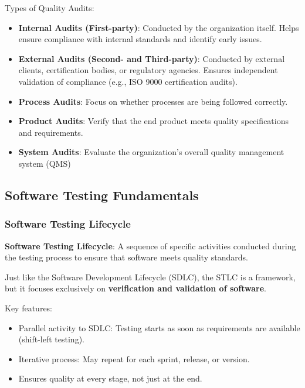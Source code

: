 \bigskip

Types of Quality Audits:

\begin{itemize}
    \item \textbf{Internal Audits (First-party)}: Conducted by the organization itself. Helps ensure compliance with internal standards and identify early issues.
    \item \textbf{External Audits (Second- and Third-party)}: Conducted by external clients, certification bodies, or regulatory agencies. Ensures independent validation of compliance (e.g., ISO 9000 certification audits).
    \item \textbf{Process Audits}: Focus on whether processes are being followed correctly.
    \item \textbf{Product Audits}: Verify that the end product meets quality specifications and requirements.
    \item \textbf{System Audits}: Evaluate the organization’s overall quality management system (QMS)
\end{itemize}

\subsection{Software Testing Fundamentals}

\subsubsection{Software Testing Lifecycle}

\indent 

\noindent\textbf{Software Testing Lifecycle}: A sequence of specific activities conducted during the testing process to ensure that software meets quality standards.

\bigskip  

Just like the Software Development Lifecycle (SDLC), the STLC is a framework, but it focuses exclusively on \textbf{verification and validation of software}.

\bigskip

\noindent Key features:

\begin{itemize}
    \item Parallel activity to SDLC: Testing starts as soon as requirements are available (shift-left testing).
    \item Iterative process: May repeat for each sprint, release, or version.
    \item Ensures quality at every stage, not just at the end.
\end{itemize}

